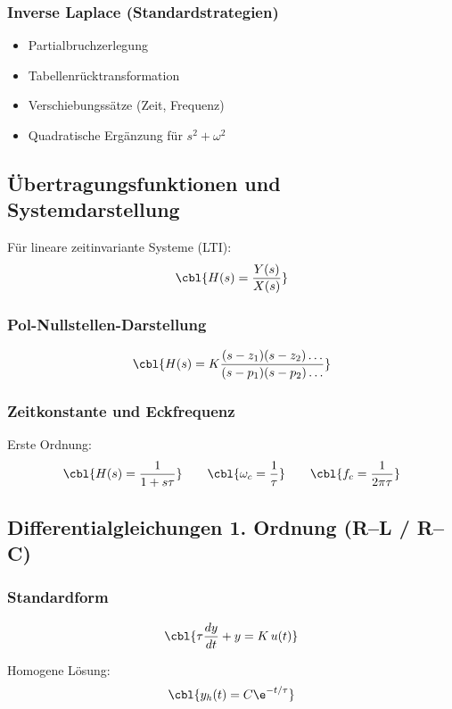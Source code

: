 \subsubsection{Inverse Laplace (Standardstrategien)}

\begin{itemize}
    \item Partialbruchzerlegung
    \item Tabellenrücktransformation
    \item Verschiebungssätze (Zeit, Frequenz)
    \item Quadratische Ergänzung für $s^2+\omega^2$
\end{itemize}

\subsection{Übertragungsfunktionen und Systemdarstellung}

Für lineare zeitinvariante Systeme (LTI):
\[
\cbl{H(s) = \frac{Y(s)}{X(s)}}
\]

\subsubsection{Pol-Nullstellen-Darstellung}

\[
\cbl{H(s)=K \frac{(s-z_1)(s-z_2)\dots}{(s-p_1)(s-p_2)\dots}}
\]

\subsubsection{Zeitkonstante und Eckfrequenz}

Erste Ordnung:
\[
\cbl{H(s)=\frac{1}{1+s\tau}}
\qquad
\cbl{\omega_c = \frac{1}{\tau}}
\qquad
\cbl{f_c = \frac{1}{2\pi\tau}}
\]

\subsection{Differentialgleichungen 1. Ordnung (R--L / R--C)}

\subsubsection{Standardform}

\[
\cbl{\tau \frac{dy}{dt} + y = K \, u(t)}
\]

Homogene Lösung:
\[
\cbl{y_h(t) = C \e^{-t/\tau}}
\]

